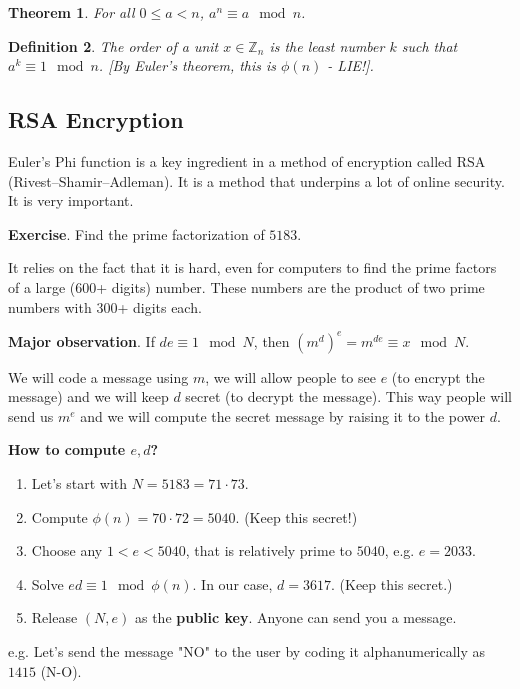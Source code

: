 \documentclass[11pt]{article}
\newtheorem{thm}{Theorem}
\newtheorem{dfn}[thm]{Definition}
\theoremstyle{definition}
\numberwithin{thm}{section}
\begin{document}
\begin{thm} For all $0 \leq a < n$, $a^n \equiv a \mod n$.
\end{thm}

\begin{dfn} The order of a unit $x \in \mathbb{Z}_n$ is the least number $k$ such that $a^k \equiv 1 \mod n$. [By Euler's theorem, this is $\phi(n)$ - LIE!].
\end{dfn}

\subsection{RSA Encryption}

Euler's Phi function is a key ingredient in a method of encryption called RSA (Rivest–Shamir–Adleman). It is a method that underpins a lot of online security. It is very important.

\textbf{Exercise}. Find the prime factorization of $5183$.

It relies on the fact that it is hard, even for computers to find the prime factors of a large (600+ digits) number. These numbers are the product of two prime numbers with 300+ digits each.

\textbf{Major observation}. If $de \equiv 1 \mod N$, then $(m^d)^e = m^{de} \equiv x \mod N$.

We will code a message using $m$, we will allow people to see $e$ (to encrypt the message) and we will keep $d$ secret (to decrypt the message). This way people will send us $m^e$ and we will compute the secret message by raising it to the power $d$.

\textbf{How to compute $e,d$?}

\begin{enumerate}
	\item Let's start with $N = 5183 = 71 \cdot 73$. 
    \item Compute $\phi(n) = 70 \cdot 72 = 5040$. (Keep this secret!)
    \item Choose any $1 < e < 5040$, that is relatively prime to $5040$, e.g. $e = 2033$.
    \item Solve $ed \equiv 1 \mod \phi(n)$. In our case, $d = 3617$. (Keep this secret.)
    \item Release $(N, e)$ as the \textbf{public key}. Anyone can send you a message.
\end{enumerate}

e.g. Let's send the message "NO" to the user by coding it alphanumerically as $1415$ (N-O).
\end{document}
